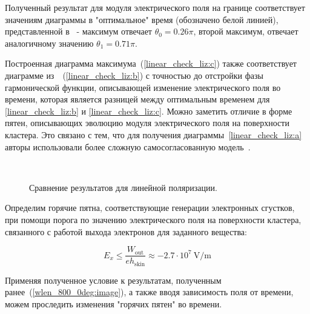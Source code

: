 Полученный результат для модуля электрического поля на границе соответствует значениям диаграммы в "оптимальное" время (обозначено белой линией), представленной в~\cite{liseykina} - максимум отвечает $\theta_0 = 0.26 \pi$, второй максимум, отвечает аналогичному значению $\theta_1 = 0.71 \pi$. 

Построенная диаграмма максимума~(\autoref{linear_check_liz:c}) также соответствует диаграмме из~\cite{liseykina}~(\autoref{linear_check_liz:b}) с точностью до отстройки фазы гармонической функции, описывающей изменение электрического поля во времени, которая является разницей между оптимальным временем для \autoref{linear_check_liz:b} и \autoref{linear_check_liz:c}. Можно заметить отличие в форме пятен, описывающих эволюцию модуля электрического поля на поверхности кластера. Это связано с тем, что для получения диаграммы~\autoref{linear_check_liz:a} авторы использовали более сложную самосогласованную модель~\cite{liseykina}.

\begin{figure}[H]
    \hfil
    \\
    \caption{Сравнение результатов для линейной поляризации.}\label{linear_check_liz:image}
\end{figure}

Определим горячие пятна, соответствующие генерации электронных сгустков, при помощи порога по значению электрического поля на поверхности кластера, связанного с работой выхода электронов для заданного вещества:

    \begin{equation}
        E_x \leq \frac{W_{\textrm{out}}}{e h_{\textrm{skin}}} \approx -2.7 \cdot 10^{7} \:\textrm{V/m}
    \end{equation}

Применяя полученное условие к результатам, полученным ранее~(\autoref{wlen_800_0deg:image}), а также вводя зависимость поля от времени, можем проследить изменения "горячих пятен" во времени.

